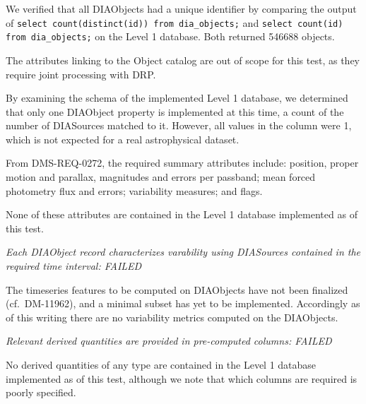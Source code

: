 \documentclass[DM,lsstdraft,STR,toc]{lsstdoc}
\begin{document}
We verified that all DIAObjects had a unique identifier by comparing the 
output of \texttt{select count(distinct(id)) from dia\_objects;} and
\texttt{select count(id) from dia\_objects;} on the Level 1 database.  
Both returned 546688 objects.

The attributes linking to the Object catalog are out of scope for this test, as
they require joint processing with DRP.

By examining the schema of the implemented Level 1 database, we determined that only one DIAObject property is implemented at this time, a count of the number
of DIASources matched to it.  However, all values in the column were 1, which 
is not expected for a real astrophysical dataset.


From DMS-REQ-0272, the required summary attributes include: 
position, proper motion and parallax, magnitudes and errors per passband; 
mean forced photometry flux and errors; variability measures; and flags.

None of these attributes are contained in the Level 1 database 
implemented as of this test.


\textit{Each DIAObject record characterizes varability using DIASources contained in the required time interval: FAILED}

The timeseries features to be computed on DIAObjects have not been finalized
(cf.\ DM-11962), and a minimal subset has yet to be implemented.  Accordingly
as of this writing there are no variability metrics computed on the DIAObjects.

\textit{Relevant derived quantities are provided in pre-computed columns: FAILED}

No derived quantities of any type are contained in the Level 1 database 
implemented as of this test, although we note that which
columns are required is poorly specified.
\end{document}
